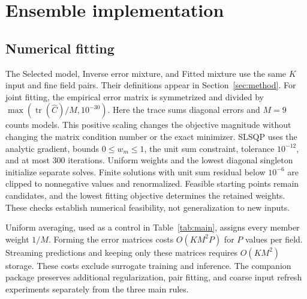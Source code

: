\section{Ensemble implementation}
\subsection{Numerical fitting}
\label{app:numerics}
The Selected model, Inverse error mixture, and Fitted mixture use the same
$K$ input and fine field pairs. Their definitions appear in
Section~\ref{sec:method}. For joint fitting, the empirical error matrix is
symmetrized and divided by
$\max(\operatorname{tr}(\widehat C)/M,10^{-30})$. Here the trace sums diagonal
errors and $M=9$ counts models. This positive scaling changes the objective
magnitude without changing the matrix condition number or the exact minimizer. SLSQP uses the analytic
gradient, bounds $0\leq w_m\leq1$, the unit sum constraint, tolerance
$10^{-12}$, and at most 300 iterations. Uniform weights and the lowest
diagonal singleton initialize separate solves. Finite solutions with unit sum
residual below $10^{-6}$ are clipped to nonnegative values and renormalized.
Feasible starting points remain candidates, and the lowest fitting objective
determines the retained weights. These checks establish numerical feasibility,
not generalization to new inputs.

Uniform averaging, used as a control in Table~\ref{tab:main}, assigns every
member weight $1/M$. Forming the error matrices costs $O(KM^2P)$ for $P$
values per field. Streaming predictions and keeping only these matrices
requires $O(KM^2)$ storage. These costs exclude surrogate training and inference.
The companion package preserves additional regularization, pair fitting, and
coarse input refresh experiments separately from the three main rules.



